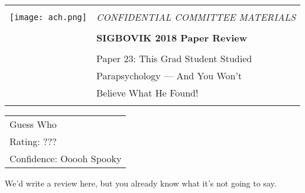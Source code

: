 \documentclass[12pt]{article}
\begin{document}
{\sffamily
\begin{tabular}{ll}
\multirow{3}{*}{\texttt{[image: ach.png]}}\\
& \Large{\em CONFIDENTIAL COMMITTEE MATERIALS} \\
&\\
& \textbf{\Huge{SIGBOVIK 2018 Paper Review}} \\
&\\
& \LARGE{Paper 23: This Grad Student Studied} \\[0.25em]
& \LARGE{Parapsychology --- And You Won’t} \\[0.25em]
& \LARGE{Believe What He Found!} \\
&\\
\hline
\end{tabular}}
\vspace{2em}
\thispagestyle{empty}

{\large\bf
\begin{tabular}{l}
Guess Who \\
Rating: ??? \\
Confidence: Ooooh Spooky \\
\end{tabular}}
\vspace{1em}

We'd write a review here, but you already know what it's not going to say.
\end{document}
